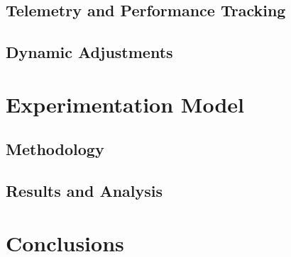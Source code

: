 \subsection{Telemetry and Performance Tracking}

\subsection{Dynamic Adjustments}

\section{Experimentation Model}

\subsection{Methodology}

\subsection{Results and Analysis}

\section{Conclusions}


